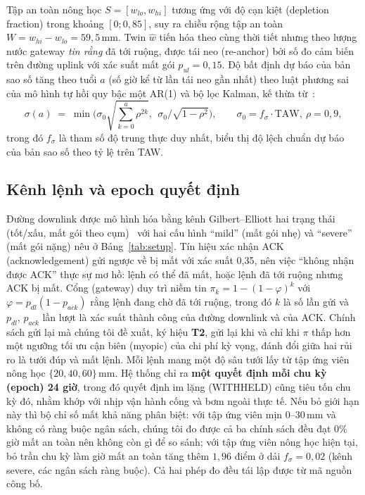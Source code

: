 \documentclass[10pt]{article}
\begin{document}
Tập an toàn nông học $S = [w_{lo}, w_{hi}]$ tương ứng với độ cạn kiệt (depletion fraction) trong khoảng $[0; 0{,}85]$, suy ra chiều rộng tập an toàn $W = w_{hi} - w_{lo} = 59{,}5$\,mm. Twin $\hat w$ tiến hóa theo cùng thời tiết nhưng theo lượng nước gateway \emph{tin rằng} đã tới ruộng, được tái neo (re-anchor) bởi số đo cảm biến trên đường uplink với xác suất mất gói $p_{ul}=0{,}15$. Độ bất định dự báo của bản sao số tăng theo tuổi $a$ (số giờ kể từ lần tái neo gần nhất) theo luật phương sai của mô hình tự hồi quy bậc một AR(1) và bộ lọc Kalman, kế thừa từ~\cite{cawvou}:
\begin{equation}
\sigma(a) \;=\; \min\!\Big(\sigma_0 \sqrt{\textstyle\sum_{k=0}^{a} \rho^{2k}},\ \ \sigma_0/\sqrt{1-\rho^2}\Big),\qquad \sigma_0 = f_\sigma \cdot \mathrm{TAW},\ \rho=0{,}9,
\label{eq:sigma}
\end{equation}
trong đó $f_\sigma$ là tham số độ trung thực duy nhất, biểu thị độ lệch chuẩn dự báo của bản sao số theo tỷ lệ trên TAW.

\subsection{Kênh lệnh và epoch quyết định}

Đường downlink được mô hình hóa bằng kênh Gilbert--Elliott hai trạng thái (tốt/xấu, mất gói theo cụm)~\cite{gilbert1960,elliott1963} với hai cấu hình ``mild'' (mất gói nhẹ) và ``severe'' (mất gói nặng) nêu ở Bảng~\ref{tab:setup}. Tín hiệu xác nhận ACK (acknowledgement) gửi ngược về bị mất với xác suất 0,35, nên việc ``không nhận được ACK'' thực sự mơ hồ: lệnh có thể đã mất, hoặc lệnh đã tới ruộng nhưng ACK bị mất. Cổng (gateway) duy trì niềm tin $\pi_k = 1-(1-\varphi)^k$ với $\varphi = p_{dl}(1-p_{ack})$ rằng lệnh đang chờ đã tới ruộng, trong đó $k$ là số lần gửi và $p_{dl}$, $p_{ack}$ lần lượt là xác suất thành công của đường downlink và của ACK. Chính sách gửi lại mà chúng tôi đề xuất, ký hiệu \textbf{T2}, gửi lại khi và chỉ khi $\pi$ thấp hơn một ngưỡng tối ưu cận biên (myopic) của chi phí kỳ vọng, đánh đổi giữa hai rủi ro là tưới đúp và mất lệnh. Mỗi lệnh mang một độ sâu tưới lấy từ tập ứng viên nông học $\{20, 40, 60\}$\,mm. Hệ thống chỉ ra \textbf{một quyết định mỗi chu kỳ (epoch) 24 giờ}, trong đó quyết định im lặng (WITHHELD) cũng tiêu tốn chu kỳ đó, nhằm khớp với nhịp vận hành cống và bơm ngoài thực tế. Nếu bỏ giới hạn này thì bộ chỉ số mất khả năng phân biệt: với tập ứng viên mịn $0$--$30$\,mm và không có ràng buộc ngân sách, chúng tôi đo được cả ba chính sách đều đạt $0\%$ giờ mất an toàn nên không còn gì để so sánh; với tập ứng viên nông học hiện tại, bỏ trần chu kỳ làm giờ mất an toàn tăng thêm $1{,}96$ điểm ở dải $f_\sigma=0{,}02$ (kênh severe, các ngân sách ràng buộc). Cả hai phép đo đều tái lập được từ mã nguồn công bố.
\end{document}
